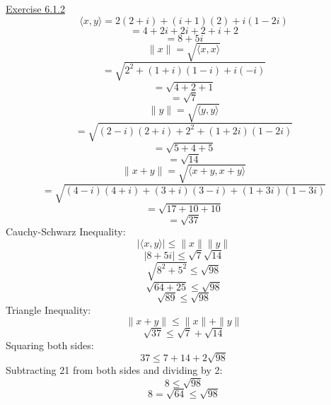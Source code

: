 \documentclass{exam}
\begin{document}
\underline{Exercise 6.1.2}
\newline
\newline
\[\langle x,y\rangle=2(2+i)+(i+1)(2)+i(1-2i)\]
\[=4+2i+2i+2+i+2\]
\[=8+5i\]
\newline
\[\|x\|=\sqrt{\langle x,x\rangle}\]
\[=\sqrt{2^2+(1+i)(1-i)+i(-i)}\]
\[=\sqrt{4+2+1}\]
\[=\sqrt{7}\]
\newline
\[\|y\|=\sqrt{\langle y,y\rangle}\]
\[=\sqrt{(2-i)(2+i)+2^2+(1+2i)(1-2i)}\]
\[=\sqrt{5+4+5}\]
\[=\sqrt{14}\]
\newline
\[\|x+y\|=\sqrt{\langle x+y,x+y\rangle}\]
\[=\sqrt{(4-i)(4+i)+(3+i)(3-i)+(1+3i)(1-3i)}\]
\[=\sqrt{17+10+10}\]
\[=\sqrt{37}\]
\newline
Cauchy-Schwarz Inequality:
\[|\langle x,y\rangle|\le\|x\|\|y\|\]
\[|8+5i|\le\sqrt{7}\sqrt{14}\]
\[\sqrt{8^2+5^2}\le\sqrt{98}\]
\[\sqrt{64+25}\le\sqrt{98}\]
\[\sqrt{89}\le\sqrt{98}\]
\newline
Triangle Inequality:
\[\|x+y\|\le\|x\|+\|y\|\]
\[\sqrt{37}\le\sqrt{7}+\sqrt{14}\]
Squaring both sides:
\[37\le7+14+2\sqrt{98}\]
Subtracting 21 from both sides and dividing by 2:
\[8\le\sqrt{98}\]
\[8=\sqrt{64}\le\sqrt{98}\]
\newline
\end{document}

